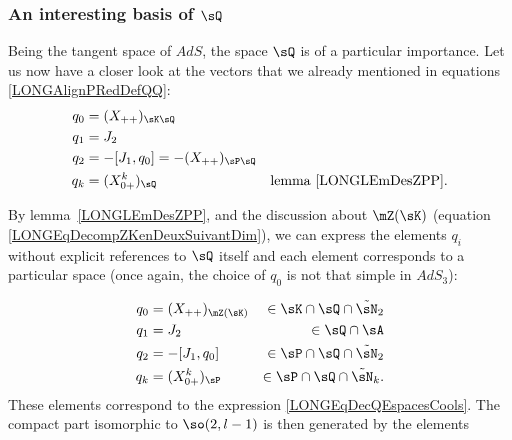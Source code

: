 %
\subsubsection{An interesting basis of \texorpdfstring{$\sQ$}{Q}}
%
\label{LONGSubSubSecInterestingBasisQ}

Being the tangent space of $AdS$, the space $\sQ$ is of a particular importance. Let us now have a closer look at the vectors that we already mentioned in equations \eqref{LONGAlignPRedDefQQ}:
\begin{subequations}				\label{LONGEqBasQQzi}
	\begin{align}
		q_0 & =(X_{++})_{\sK\sQ}                                                 \\
		q_1 & =J_2                                                               \\
		q_2 & =-[J_1,q_0]=-(X_{++})_{\sP\sQ}                                     \\
		q_k & =(X^k_{0+})_{\sQ}              & \text{lemma~\ref{LONGLEmDesZPP}}.
	\end{align}
\end{subequations}

By lemma~\ref{LONGLEmDesZPP}, and the discussion about $\mZ(\sK)$ (equation \eqref{LONGEqDecompZKenDeuxSuivantDim}), we can express the elements $q_i$ without explicit references to $\sQ$ itself and each element corresponds to a particular space (once again, the choice of $q_0$ is not that simple in $AdS_3$):

%
\begin{subequations}		\label{LONGEqBasQQziPlusMieux}%
	\begin{align}
		q_0 & =(X_{++})_{\mZ(\sK)} & \in \sK\cap\sQ\cap\tilde\sN_2                            \\
		q_1 & =J_2                 & \in\sQ\cap\sA                                            \\
		q_2 & =-[J_1,q_0]          & \in\sP\cap\sQ\cap\tilde\sN_2	\label{LONGsubEqJUnQZQDeux} \\
		q_k & =(X^k_{0+})_{\sP}    & \in\sP\cap\sQ\cap\tilde\sN_k.
	\end{align}
\end{subequations}
These elements correspond to the expression \eqref{LONGEqDecQEspacesCools}.
%
The compact part isomorphic to $\so(2,l-1)$ is then generated by the elements%

